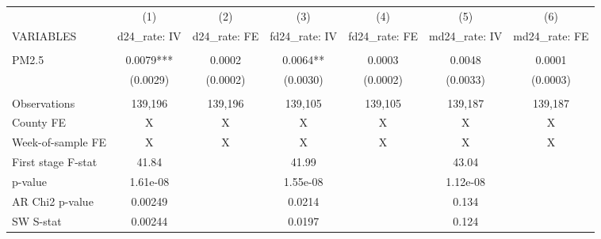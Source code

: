 \begin{tabular}{lcccccc} \hline
 & (1) & (2) & (3) & (4) & (5) & (6) \\
VARIABLES & d24\_rate: IV & d24\_rate: FE & fd24\_rate: IV & fd24\_rate: FE & md24\_rate: IV & md24\_rate: FE \\ \hline
 &  &  &  &  &  &  \\
PM2.5 & 0.0079*** & 0.0002 & 0.0064** & 0.0003 & 0.0048 & 0.0001 \\
 & (0.0029) & (0.0002) & (0.0030) & (0.0002) & (0.0033) & (0.0003) \\
 &  &  &  &  &  &  \\
Observations & 139,196 & 139,196 & 139,105 & 139,105 & 139,187 & 139,187 \\
County FE & X & X & X & X & X & X \\
Week-of-sample FE & X & X & X & X & X & X \\
First stage F-stat & 41.84 &  & 41.99 &  & 43.04 &  \\
p-value & 1.61e-08 &  & 1.55e-08 &  & 1.12e-08 &  \\
AR Chi2 p-value & 0.00249 &  & 0.0214 &  & 0.134 &  \\
 SW S-stat & 0.00244 &  & 0.0197 &  & 0.124 &  \\ \hline
\end{tabular}
